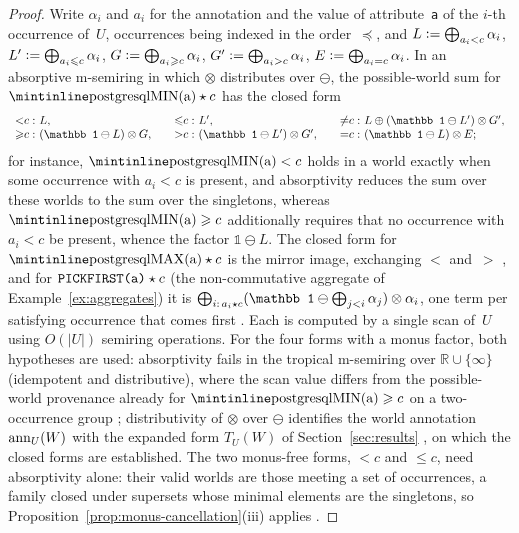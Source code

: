 \begin{proof}
Write $\alpha_i$ and $a_i$ for the annotation and the value of
attribute~\texttt{a} of the $i$-th occurrence of~$U$, occurrences being
indexed in the order~$\preceq$, and
$L\mathrel{\mathop:}=\bigoplus_{a_i<c}\alpha_i$, $L'\mathrel{\mathop:}=\bigoplus_{a_i\leqslant c}\alpha_i$,
$G\mathrel{\mathop:}=\bigoplus_{a_i\geqslant c}\alpha_i$, $G'\mathrel{\mathop:}=\bigoplus_{a_i>c}\alpha_i$,
$E\mathrel{\mathop:}=\bigoplus_{a_i=c}\alpha_i$. In an absorptive m-semiring in which
$\otimes$ distributes over $\ominus$, the possible-world sum for
$\text{\sql{MIN(a)}}\op c$ has the closed form
\[
\begin{array}{r@{\ }l@{\qquad}r@{\ }l@{\qquad}r@{\ }l}
{<}c: & L, & {\le}c: & L', & {\ne}c: & L\oplus(\mathbb 1\ominus L')\otimes G',\\
{\ge}c: & (\mathbb 1\ominus L)\otimes G, & {>}c: & (\mathbb 1\ominus L')\otimes G', & {=}c: & (\mathbb 1\ominus L)\otimes E;
\end{array}
\]
for instance, $\text{\sql{MIN(a)}}<c$ holds in a world exactly when some
occurrence with $a_i<c$ is present, and absorptivity reduces the sum over
these worlds to the sum over the singletons, whereas $\text{\sql{MIN(a)}}\ge c$
additionally requires that no occurrence with $a_i<c$ be present, whence
the factor $\mathbb 1\ominus L$. The closed form for $\text{\sql{MAX(a)}}\op c$
is the mirror image, exchanging $<$ and~$>$
, and for
$\text{\texttt{PICKFIRST}\texttt{(a)}}\mathbin{\mathsf{\star}} c$ (the non-commutative aggregate of
Example~\ref{ex:aggregates}) it is
$\bigoplus_{i:\,a_i\op c}(\mathbb 1\ominus\bigoplus_{j<i}\alpha_j)\otimes\alpha_i$,
one term per satisfying occurrence that comes first
. Each is computed by a
single scan of~$U$ using $O(|U|)$ semiring operations. For the four
forms with a monus factor, both hypotheses are used: absorptivity fails in the tropical m-semiring over
$\mathbb R\cup\{\infty\}$ (idempotent and distributive), where the scan
value differs from the possible-world provenance already for
$\text{\sql{MIN(a)}}\ge c$ on a two-occurrence group
; distributivity of
$\otimes$ over $\ominus$ identifies the world annotation $\mathrm{ann}_U(W)$ with
the expanded form $T_U(W)$ of Section~\ref{sec:results}
, on which the closed forms
are established. The two monus-free forms, ${}<c$ and ${}\le c$, need
absorptivity alone: their valid worlds are those meeting a set of
occurrences, a family closed under supersets whose minimal elements
are the singletons, so
Proposition~\ref{prop:monus-cancellation}(iii) applies
.


\end{proof}
